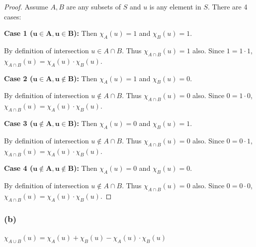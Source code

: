 \documentclass[14pt]{extarticle}
\begin{document}
\begin{proof}
Assume $A, B$ are any subsets of $S$ and $u$ is any element in $S$. There are 4 cases:

{\bf Case 1 (\(\bm{u \in A, u \in B}\)):} Then \(\chi_A(u) = 1 \) and \(\chi_B(u) = 1\). 

By definition of intersection \(u \in A \cap B\). Thus
\(\chi_{A \cap B}(u) = 1\) also. Since $1 = 1 \cdot 1$,
\(\chi_{A \cap B}(u) = \chi_A(u) \cdot \chi_B(u)\).

{\bf Case 2 (\(\bm{u \in A, u \notin B}\)):} Then \(\chi_A(u) = 1 \) and \(\chi_B(u) = 0\). 

By definition of intersection \(u \notin A \cap B\). Thus
\(\chi_{A \cap B}(u) = 0\) also. Since $0 = 1 \cdot 0$,
\(\chi_{A \cap B}(u) = \chi_A(u) \cdot \chi_B(u)\).

{\bf Case 3 (\(\bm{u \notin A, u \in B}\)):} Then \(\chi_A(u) = 0 \) and \(\chi_B(u) = 1\). 

By definition of intersection \(u \notin A \cap B\). Thus
\(\chi_{A \cap B}(u) = 0\) also. Since $0 = 0 \cdot 1$,
\(\chi_{A \cap B}(u) = \chi_A(u) \cdot \chi_B(u)\).

{\bf Case 4 (\(\bm{u \notin A, u \notin B}\)):} Then \(\chi_A(u) = 0 \) and \(\chi_B(u) = 0\). 

By definition of intersection \(u \notin A \cap B\). Thus
\(\chi_{A \cap B}(u) = 0\) also. Since $0 = 0 \cdot 0$,
\(\chi_{A \cap B}(u) = \chi_A(u) \cdot \chi_B(u)\).
\end{proof}

\subsubsection{(b)}
\(\chi_{A \cup B}(u) = \chi_A(u) + \chi_B(u) - \chi_A(u) \cdot \chi_B(u)\)
\end{document}
